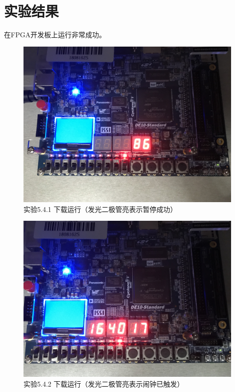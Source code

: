 \documentclass[12pt,a4paper,UTF8]{article}
\begin{document}
\section{实验结果}
在FPGA开发板上运行非常成功。
\begin{figure}[H]
  \centering
  \includegraphics[width=1\textwidth]{1_fpga.jpg}
  \caption{实验5.4.1 下载运行（发光二极管亮表示暂停成功）}
  \label{1_fpga}
\end{figure}
\begin{figure}[H]
  \centering
  \includegraphics[width=1\textwidth]{2_fpga.JPG}
  \caption{实验5.4.2 下载运行（发光二极管亮表示闹钟已触发）}
  \label{2_fpga}
\end{figure}
\end{document}
